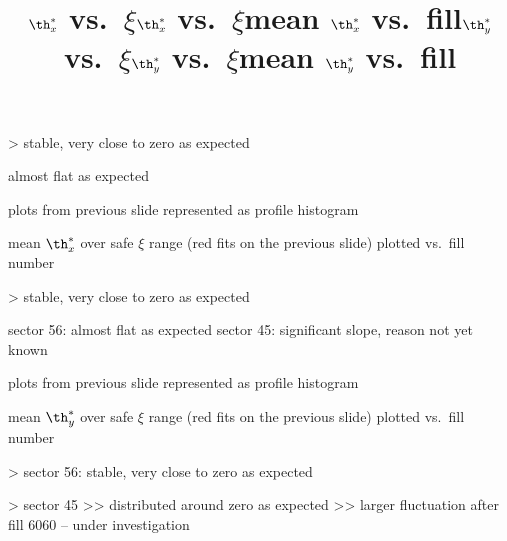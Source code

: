 \centerline{}

\>> stable, very close to zero as expected


\newpage %
\title{$\th^*_x$ vs.~$\xi$}

\centerline{}

\> almost flat as expected


\newpage %
\title{$\th^*_x$ vs.~$\xi$}

\> plots from previous slide represented as profile histogram

\centerline{}

\newpage %
\title{mean $\th^*_x$ vs.~fill}

\> mean $\th^*_x$ over safe $\xi$ range (red fits on the previous slide) plotted vs.~fill number

\centerline{}

\>> stable, very close to zero as expected



\newpage %
\title{$\th^*_y$ vs.~$\xi$}

\centerline{}

\> sector 56: almost flat as expected
\> sector 45: significant slope, reason not yet known

\newpage %
\title{$\th^*_y$ vs.~$\xi$}

\> plots from previous slide represented as profile histogram

\centerline{}


\newpage %
\title{mean $\th^*_y$ vs.~fill}

\> mean $\th^*_y$ over safe $\xi$ range (red fits on the previous slide) plotted vs.~fill number

\centerline{}

\>> sector 56: stable, very close to zero as expected

\>> sector 45
\>>> distributed around zero as expected
\>>> larger fluctuation after fill 6060 -- under investigation

\vfil
\eject
\bye
